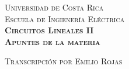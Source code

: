 %
%
%
{
  \thispagestyle{titlingpage}
  \vspace*{\fill}
  \begin{center}

    \textsc{\large Universidad de Costa Rica}\\
    [0.25in]

    \textsc{\large Escuela de Ingienería Eléctrica}\\
    [0.55in]

    \textsc{\Large \bfseries Circuitos Lineales II}\\
    [0.25in]

    \textsc{\Huge \bfseries Apuntes de la materia}\\
    [0.5in]
  \end{center}
  \vspace*{\fill}

  \begin{center}
    \textsc{\small Transcripción por Emilio Rojas}
  \end{center}
}
